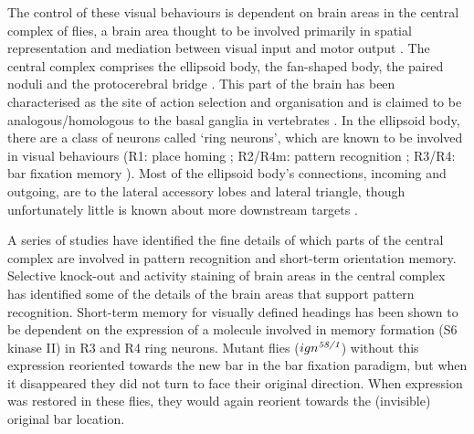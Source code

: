 The control of these visual behaviours is dependent on brain areas in the central complex of flies, a brain area thought to be involved primarily in spatial representation and mediation between visual input and motor output \cite{Pfeiffer2014}.
The central complex comprises the ellipsoid body, the fan-shaped body, the paired noduli and the protocerebral bridge \cite{Young2010}.
This part of the brain has been characterised as the site of action selection and organisation and is claimed to be analogous/homologous to the basal ganglia in vertebrates \cite{Strausfeld2013}.
In the ellipsoid body, there are a class of neurons called `ring neurons', which are known to be involved in visual behaviours (R1: place homing \cite{Ofstad2011,Sitaraman2010,Sitaraman2008}; R2/R4m: pattern recognition \cite{Pan2009,Liu2006,Ernst1999}; R3/R4: bar fixation memory \cite{Neuser2008}).
Most of the ellipsoid body's connections, incoming and outgoing, are to the lateral accessory lobes and lateral triangle, though unfortunately little is known about more downstream targets \cite{Pfeiffer2014,Young2010}.

A series of studies have identified the fine details of which parts of the central complex are involved in pattern recognition and short-term orientation memory.
Selective knock-out and activity staining of brain areas in the central complex has identified some of the details of the brain areas that support pattern recognition.
Short-term memory for visually defined headings has been shown to be dependent on the expression of a molecule involved in memory formation (S6 kinase II) in R3 and R4 ring neurons.
Mutant flies ($ign^{\emph{58/1}}$) without this expression reoriented towards the new bar in the bar fixation paradigm, but when it disappeared they did not turn to face their original direction.
When expression was restored in these flies, they would again reorient towards the (invisible) original bar location.

